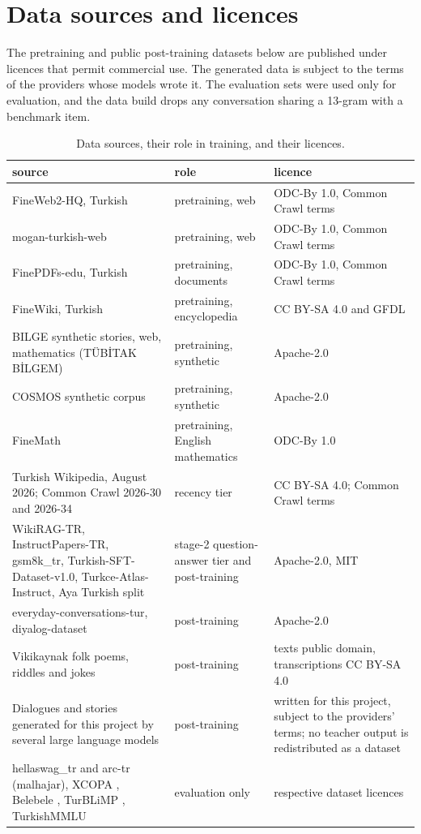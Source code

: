 \documentclass[11pt]{article}
\begin{document}
\clearpage
\appendix
\section{Data sources and licences}\label{app:data}
The pretraining and public post-training datasets below are published under licences that permit commercial use. The generated data is subject to the terms of the providers whose models wrote it. The evaluation sets were used only for evaluation, and the data build drops any conversation sharing a 13-gram with a benchmark item.

\begin{table}[!h]\centering\small
\begin{tabular}{>{\raggedright\arraybackslash}p{4.9cm}>{\raggedright\arraybackslash}p{4.4cm}>{\raggedright\arraybackslash}p{4.6cm}}
\toprule
source & role & licence\\
\midrule
FineWeb2-HQ, Turkish \cite{fw2hq,fineweb2} & pretraining, web & ODC-By 1.0, Common Crawl terms\\
mogan-turkish-web & pretraining, web & ODC-By 1.0, Common Crawl terms\\
FinePDFs-edu, Turkish & pretraining, documents & ODC-By 1.0, Common Crawl terms\\
FineWiki, Turkish & pretraining, encyclopedia & CC BY-SA 4.0 and GFDL\\
BILGE synthetic stories, web, mathematics (T\"UB\.ITAK B\.ILGEM) & pretraining, synthetic & Apache-2.0\\
COSMOS synthetic corpus & pretraining, synthetic & Apache-2.0\\
FineMath & pretraining, English mathematics & ODC-By 1.0\\
Turkish Wikipedia, August 2026; Common Crawl 2026-30 and 2026-34 & recency tier & CC BY-SA 4.0; Common Crawl terms\\
WikiRAG-TR, InstructPapers-TR, gsm8k\_tr, Turkish-SFT-Dataset-v1.0, Turkce-Atlas-Instruct, Aya Turkish split \cite{aya} & stage-2 question-answer tier and post-training & Apache-2.0, MIT\\
everyday-conversations-tur, diyalog-dataset & post-training & Apache-2.0\\
Vikikaynak folk poems, riddles and jokes & post-training & texts public domain, transcriptions CC BY-SA 4.0\\
Dialogues and stories generated for this project by several large language models & post-training & written for this project, subject to the providers' terms; no teacher output is redistributed as a dataset\\
hellaswag\_tr and arc-tr (malhajar), XCOPA \cite{xcopa}, Belebele \cite{belebele}, TurBLiMP \cite{turblimp}, TurkishMMLU \cite{turkishmmlu} & evaluation only & respective dataset licences\\
\bottomrule
\end{tabular}
\caption{Data sources, their role in training, and their licences.}
\label{tab:data}
\end{table}
\end{document}
